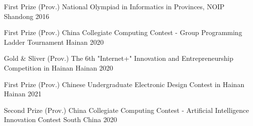 \begin{cvhonors}
\cvhonor
{First Prize} %
{(Prov.) National Olympiad in Informatics in Provinces, NOIP} %
{Shandong} %
{2016} %

\cvhonor
{First Prize} %
{(Prov.) China Collegiate Computing Contest - Group Programming Ladder Tournament} %
{Hainan} %
{2020} %

\cvhonor
{Gold \& Sliver} %
{(Prov.) The 6th "Internet+" Innovation and Entrepreneurship Competition in Hainan} %
{Hainan} %
{2020} %

\cvhonor
{First Prize} %
{(Prov.) Chinese Undergraduate Electronic Design Contest in Hainan} %
{Hainan} %
{2021} %

\cvhonor
{Second Prize} %
{(Prov.) China Collegiate Computing Contest - Artificial Intelligence Innovation Contest} %
{South China} %
{2020} %





\end{cvhonors}

